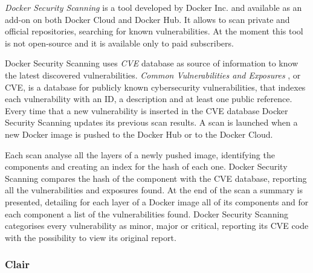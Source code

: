 \documentclass[a4paper,12pt]{article}
\begin{document}
\textit{Docker Security Scanning} \cite{docker_security_scanning} is a tool
developed by Docker Inc. and available as an add-on on both Docker Cloud and
Docker Hub. It allows to scan private and official repositories, searching for
known vulnerabilities. At the moment this tool is not open-source and it is
available only to paid subscribers. \par Docker Security Scanning uses
\textit{CVE} database as source of information to know the latest discovered
vulnerabilities. \textit{Common Vulnerabilities and Exposures}
\cite{common_vulnerabilities_exposures}, or CVE, is a database for publicly
known cybersecurity vulnerabilities, that indexes each vulnerability with an
ID, a description and at least one public reference. Every time that a new
vulnerability is inserted in the CVE database Docker Security Scanning updates
its previous scan results. A scan is launched when a new Docker image is pushed
to the Docker Hub or to the Docker Cloud. \par Each scan analyse all the layers
of a newly pushed image, identifying the components and creating an index for the
hash of each one. Docker Security Scanning compares the hash of the component with
the CVE database, reporting all the vulnerabilities and exposures found. At the
end of the scan a summary is presented, detailing for each layer of a Docker
image all of its components and for each component a list of the vulnerabilities
found. Docker Security Scanning categorises every vulnerability as minor, major
or critical, reporting its CVE code with the possibility to view its original
report.  

\subsubsection{Clair}
\end{document}
